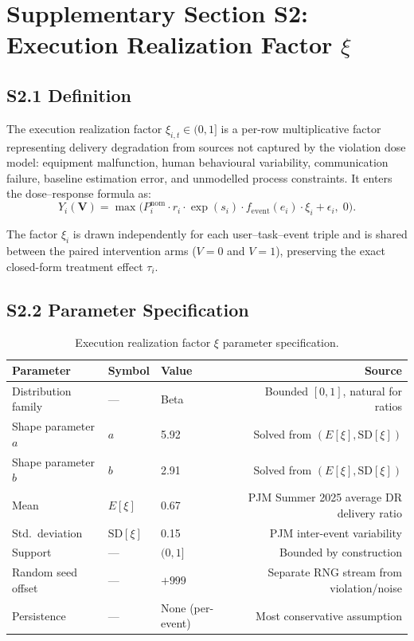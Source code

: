 %

\section*{Supplementary Section S2: Execution Realization Factor $\xi$}

\subsection*{S2.1 Definition}

The execution realization factor $\xi_{i,t} \in (0, 1]$ is a
per-row multiplicative factor representing delivery degradation
from sources not captured by the violation dose model:
equipment malfunction, human behavioural variability,
communication failure, baseline estimation error, and
unmodelled process constraints. It enters the dose--response
formula as:
\[
    Y_i(\mathbf{V}) = \max\!\bigl(P_i^{\mathrm{nom}} \cdot r_i
    \cdot \exp(s_i) \cdot f_{\mathrm{event}}(e_i) \cdot \xi_i
    + \epsilon_i,\; 0\bigr).
\]

The factor $\xi_i$ is drawn independently for each
user--task--event triple and is shared between the paired
intervention arms ($V{=}0$ and $V{=}1$), preserving the
exact closed-form treatment effect $\tau_i$.

\subsection*{S2.2 Parameter Specification}

\begin{table}[h!]
\centering
\caption{Execution realization factor $\xi$ parameter specification.}
\label{tab:xi_params}
\begin{tabular}{lllr}
\toprule
\textbf{Parameter} & \textbf{Symbol} & \textbf{Value} & \textbf{Source} \\
\midrule
Distribution family & --- & Beta & Bounded $[0,1]$, natural for ratios \\
Shape parameter $a$ & $a$ & 5.92 & Solved from $(E[\xi], \mathrm{SD}[\xi])$ \\
Shape parameter $b$ & $b$ & 2.91 & Solved from $(E[\xi], \mathrm{SD}[\xi])$ \\
Mean & $E[\xi]$ & 0.67 & PJM Summer 2025 average DR delivery ratio \\
Std.\ deviation & $\mathrm{SD}[\xi]$ & 0.15 & PJM inter-event variability \\
Support & --- & $(0, 1]$ & Bounded by construction \\
Random seed offset & --- & $+999$ & Separate RNG stream from violation/noise \\
Persistence & --- & None (per-event) & Most conservative assumption \\
\bottomrule
\end{tabular}
\end{table}

